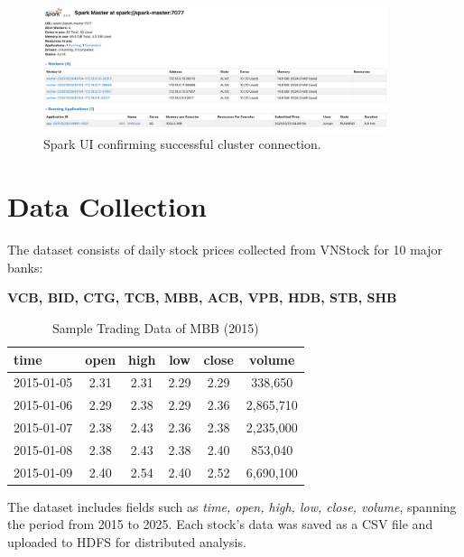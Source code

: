 \documentclass[12pt,a4paper]{article}
\begin{document}
\begin{figure}[H]
    \centering
    \includegraphics[width=0.9\textwidth]{spark_worker.png}
    \caption{Spark UI confirming successful cluster connection.}
    \label{fig:sparkui}
\end{figure}

\section{Data Collection}

The dataset consists of daily stock prices collected from VNStock for 10 major banks:

\begin{center}
\textbf{VCB, BID, CTG, TCB, MBB, ACB, VPB, HDB, STB, SHB}
\end{center}

\begin{table}[H]
\centering
\caption{Sample Trading Data of MBB (2015)}
\begin{tabular}{lccccc}
\toprule
\textbf{time} & \textbf{open} & \textbf{high} & \textbf{low} & \textbf{close} & \textbf{volume} \\
\midrule
2015-01-05 & 2.31 & 2.31 & 2.29 & 2.29 & 338{,}650 \\
2015-01-06 & 2.29 & 2.38 & 2.29 & 2.36 & 2{,}865{,}710 \\
2015-01-07 & 2.38 & 2.43 & 2.36 & 2.38 & 2{,}235{,}000 \\
2015-01-08 & 2.38 & 2.43 & 2.38 & 2.40 & 853{,}040 \\
2015-01-09 & 2.40 & 2.54 & 2.40 & 2.52 & 6{,}690{,}100 \\
\bottomrule
\end{tabular}
\end{table}

The dataset includes fields such as \textit{time, open, high, low, close, volume}, spanning the period from 2015 to 2025.  
Each stock’s data was saved as a CSV file and uploaded to HDFS for distributed analysis.
\end{document}
